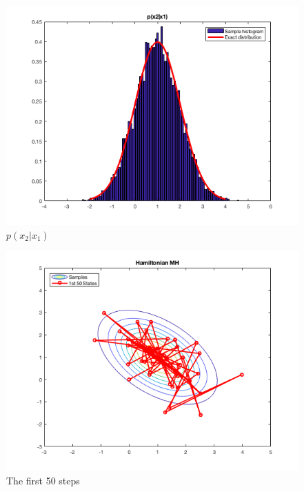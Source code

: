 \documentclass{article}
\begin{document}
\begin{figure}[h!]
\centering
\includegraphics[scale=0.55]{HW5P3_3.png}
\caption{$p(x_2 | x_1)$}
\end{figure}

\begin{figure}[h!]
\centering
\includegraphics[scale=0.55]{HW5P3_4.png}
\caption{The first 50 steps}
\end{figure}
\end{document}
